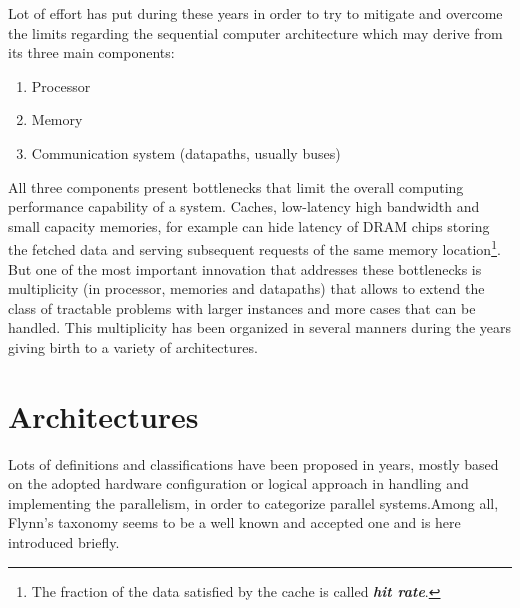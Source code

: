 


Lot of effort has put during these years in order to try to mitigate and overcome the limits regarding the sequential computer architecture which may derive from its three main components:
\begin{enumerate}

\item  Processor

\item Memory

\item  Communication system (datapaths, usually buses)
\end{enumerate}
All three components present bottlenecks that limit the overall computing performance capability of a system. Caches, low-latency high bandwidth and small capacity memories, for example can hide latency of DRAM chips storing the fetched data and serving subsequent requests of the same memory location\footnote{The fraction of the data satisfied by the cache is called \textit{\textbf{hit rate}}.}. But one of the most important innovation that addresses these bottlenecks is multiplicity (in processor, memories and datapaths) that allows to extend the class of tractable problems with larger instances and more cases that can be handled. This multiplicity has been organized in several manners during the years giving birth to a variety of architectures.

\section{Architectures}
Lots of definitions and classifications have been proposed in years, mostly based on the adopted hardware configuration or logical approach in handling and implementing the parallelism, in order to categorize parallel systems.Among all, Flynn's taxonomy seems to be a well known and accepted one and is here introduced briefly.
